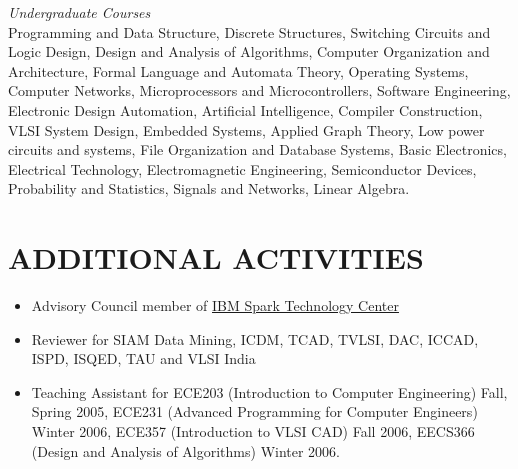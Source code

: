 \documentclass[margin]{res}
\begin{document}
\begin{resume}
{\sl Undergraduate Courses} \hfill \\
Programming and Data Structure, Discrete Structures, Switching Circuits and 
Logic Design, Design and Analysis of Algorithms, Computer Organization and Architecture, 
Formal Language and Automata Theory, Operating Systems, Computer Networks, Microprocessors 
and Microcontrollers, Software Engineering, Electronic Design Automation, Artificial 
Intelligence, Compiler Construction, VLSI System Design, Embedded Systems, Applied Graph 
Theory, Low power circuits and systems, File Organization and Database Systems, Basic Electronics,
Electrical Technology, Electromagnetic Engineering, Semiconductor Devices, Probability and 
Statistics, Signals and Networks, Linear Algebra.

\section{ADDITIONAL ACTIVITIES}
\begin{itemize} \itemsep -2pt
\item Advisory Council member of \href{http://www.spark.tc/}{IBM Spark Technology Center} 
\item Reviewer for SIAM Data Mining, ICDM, TCAD, TVLSI, DAC, ICCAD, ISPD,
  ISQED, TAU and VLSI India
\item Teaching Assistant for ECE203 (Introduction to Computer Engineering) Fall, Spring 2005, 
  ECE231 (Advanced Programming for Computer Engineers) Winter 2006, ECE357 (Introduction 
  to VLSI CAD) Fall 2006, EECS366 (Design and Analysis of Algorithms) Winter 2006.
\end{itemize}


\end{resume}
\end{document}
